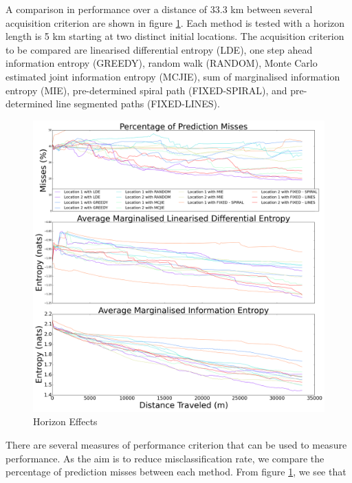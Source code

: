 \documentclass{article}
\begin{document}
		A comparison in performance over a distance of 33.3 km between several acquisition criterion are shown in figure \ref{Figure:Results:CompareMethods}. Each method is tested with a horizon length is 5 km starting at two distinct initial locations. The acquisition criterion to be compared are linearised differential entropy (LDE), one step ahead information entropy (GREEDY), random walk (RANDOM), Monte Carlo estimated joint information entropy (MCJIE), sum of marginalised information entropy (MIE), pre-determined spiral path (FIXED-SPIRAL), and pre-determined line segmented paths (FIXED-LINES).
	
		\begin{figure}[!htbp]
		\centering
			\includegraphics[width = \linewidth]{Figures/compare_methods.png}
		\caption{Horizon Effects}
		\label{Figure:Results:CompareMethods}
		\end{figure}
			
		There are several measures of performance criterion that can be used to measure performance. As the aim is to reduce misclassification rate, we compare the percentage of prediction misses between each method. From figure \ref{Figure:Results:CompareMethods}, we see that 
		
\end{document}
